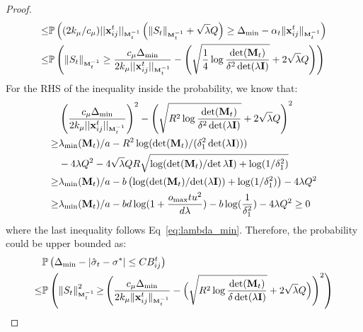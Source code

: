 \begin{proof}
\begin{align*}
    \leq& \mathbb{P} \left(({2k_{\mu}}/{c_{\mu}} )||{\mathbf{x}_{ij}^t}||_{\scriptscriptstyle \mathbf{M}_t^{-1}}
    \left(\left\| S_t\right\|_{\scriptscriptstyle \mathbf{M}_t^{-1}} + \sqrt{\lambda}Q\right) \geq \Delta_{\min} - \alpha_t\Vert{\mathbf{x}_{ij}^t}\Vert_{\scriptscriptstyle \mathbf{M}_t^{-1}}\right) \\
    \leq& \mathbb{P}\left(\left\| S_t\right\|_{\scriptscriptstyle \mathbf{M}_t^{-1}} \geq \frac{c_{\mu} \Delta_{\min}}{2k_{\mu}||{\mathbf{x}_{ij}^t}||_{\scriptscriptstyle \mathbf{M}_{t}^{-1}}} - \left(\sqrt{\frac{1}{4}\log{\frac{\det(\mathbf{M}_t)}{\delta^2 \det(\lambda \mathbf{I})}}} + 2\sqrt{\lambda} Q\right)\right)
\end{align*}
\normalsize
For the RHS of the inequality inside the probability, we know that:
\small
\begin{align*}
&\left(\frac{c_{\mu}\Delta_{\min}}{2k_{\mu}||{\mathbf{x}_{ij}^t}||_{\scriptscriptstyle \mathbf{M}_{t}^{-1}}}
\right)^2 - \left(\sqrt{R^2\log{\frac{\det(\mathbf{M}_t)}{\delta^2 \det(\lambda \mathbf{I})}}} + 2\sqrt{\lambda} Q\right)^2 \\
\geq& {\lambda_{\min}(\mathbf{M}_t)}/{a}  - R^2\log({\det(\mathbf{M}_t)}/{(\delta_1^2\det(\lambda\mathbf{I}))})  \\
&- 4\lambda Q^2 - 4\sqrt{\lambda}QR\sqrt{\log({\det(\mathbf{M}_t)}/{\det{\lambda\mathbf{I}}}) + \log({1}/{\delta_1^2})} \\
\geq& {\lambda_{\min}(\mathbf{M}_t)}/{a} - b\left(\log({\det(\mathbf{M}_t)}/{\det(\lambda\mathbf{I})})  + \log({1}/{\delta_1^2})\right)- 4\lambda Q^2\\
\geq & {\lambda_{\min}(\mathbf{M}_t)}/{a} - bd\log(1 + \frac{o_{\max}tu^2}{d\lambda}) - b\log(\frac{1}{\delta_1^2}) - 4\lambda Q^2 \geq  0
\end{align*}
\normalsize
where the last inequality follows Eq~\eqref{eq:lambda_min}. Therefore, the probability could be upper bounded as:
\small
\begin{align*}
    &\mathbb{P} \left(\Delta_{\min} - |\hat{\sigma}_t - \sigma^*| \leq CB_{ij}^t\right) \\\leq
    &\mathbb{P}\left(\left\| S_t\right\|_{\sub \bM_t^{-1}}^2  {\geq} \left(\frac{c_{\mu} \Delta_{\min}}{2k_{\mu}\Vert\xijt\Vert_{\sub \bM_{t}^{-1}}} - \Big(\sqrt{R^2\log{\frac{\det(\bM_t)}{\delta \det(\lambda \mathbf{I})}}} + 2\sqrt{\lambda} Q\Big)\right)^2\right)\\

\end{align*}
\end{proof}
